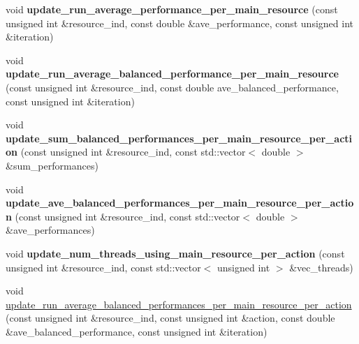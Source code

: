 \begin{DoxyCompactItemize}
\item 
\hypertarget{structStruct__OverallPerformance_ac454dbd325a845a55aa4270a2776eb10}{void {\bfseries update\-\_\-run\-\_\-average\-\_\-performance\-\_\-per\-\_\-main\-\_\-resource} (const unsigned int \&resource\-\_\-ind, const double \&ave\-\_\-performance, const unsigned int \&iteration)}\label{structStruct__OverallPerformance_ac454dbd325a845a55aa4270a2776eb10}

\item 
\hypertarget{structStruct__OverallPerformance_a935b197290050caf10fc7449c3888fbe}{void {\bfseries update\-\_\-run\-\_\-average\-\_\-balanced\-\_\-performance\-\_\-per\-\_\-main\-\_\-resource} (const unsigned int \&resource\-\_\-ind, const double ave\-\_\-balanced\-\_\-performance, const unsigned int \&iteration)}\label{structStruct__OverallPerformance_a935b197290050caf10fc7449c3888fbe}

\item 
\hypertarget{structStruct__OverallPerformance_a4d1d91cfa679c3ecc8672ab20935aef1}{void {\bfseries update\-\_\-sum\-\_\-balanced\-\_\-performances\-\_\-per\-\_\-main\-\_\-resource\-\_\-per\-\_\-action} (const unsigned int \&resource\-\_\-ind, const std\-::vector$<$ double $>$ \&sum\-\_\-performances)}\label{structStruct__OverallPerformance_a4d1d91cfa679c3ecc8672ab20935aef1}

\item 
\hypertarget{structStruct__OverallPerformance_ab1ac4196ecdc79d80b79bada3a05fbd9}{void {\bfseries update\-\_\-ave\-\_\-balanced\-\_\-performances\-\_\-per\-\_\-main\-\_\-resource\-\_\-per\-\_\-action} (const unsigned int \&resource\-\_\-ind, const std\-::vector$<$ double $>$ \&ave\-\_\-performances)}\label{structStruct__OverallPerformance_ab1ac4196ecdc79d80b79bada3a05fbd9}

\item 
\hypertarget{structStruct__OverallPerformance_aafe90e8e3cc2632788e1f9018613db68}{void {\bfseries update\-\_\-num\-\_\-threads\-\_\-using\-\_\-main\-\_\-resource\-\_\-per\-\_\-action} (const unsigned int \&resource\-\_\-ind, const std\-::vector$<$ unsigned int $>$ \&vec\-\_\-threads)}\label{structStruct__OverallPerformance_aafe90e8e3cc2632788e1f9018613db68}

\item 
void \hyperlink{structStruct__OverallPerformance_a9e7fb7b45be4dfab7234e626cd576aeb}{update\-\_\-run\-\_\-average\-\_\-balanced\-\_\-performances\-\_\-per\-\_\-main\-\_\-resource\-\_\-per\-\_\-action} (const unsigned int \&resource\-\_\-ind, const unsigned int \&action, const double \&ave\-\_\-balanced\-\_\-performance, const unsigned int \&iteration)
\end{DoxyCompactItemize}
